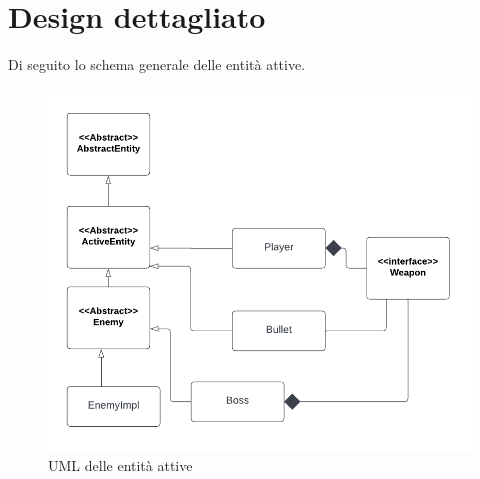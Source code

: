 \documentclass[a4paper,12pt]{report}
\begin{document}
\newpage
\section{Design dettagliato}
Di seguito lo schema generale delle entità attive.
\begin{figure}[ht]
\includegraphics[width=1\textwidth]{umlAttive.png}
\caption{UML delle entità attive}
\label{fig:schgen}
\end{figure}
\end{document}
